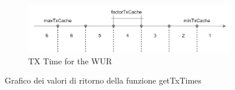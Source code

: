 \begin{figure}[h!]
  \begin{subfigure}[t]{0.9\linewidth}
    \includegraphics[width=1.1\linewidth]{Contents/Images/schemes/final2.0/getTxTrasmiss.PNG}
    \caption{TX Time for the WUR}
  \end{subfigure}
  \caption{Grafico dei valori di ritorno della funzione getTxTimes}
  \label{fig:getTxTimes_final2.0}
\end{figure}
